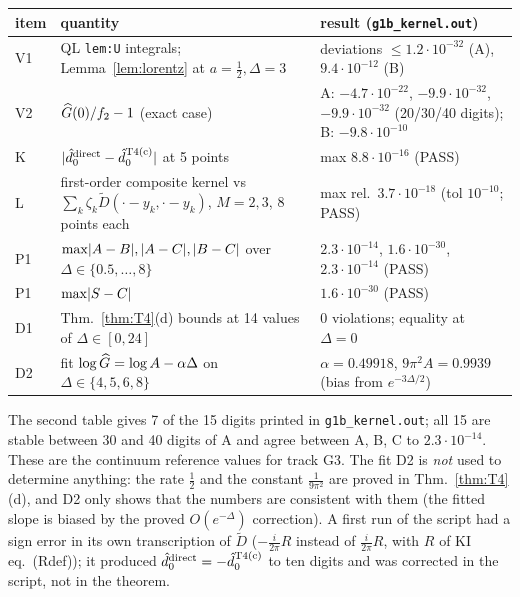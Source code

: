 \documentclass[11pt]{article}
\theoremstyle{definition}\newtheorem{hypothesis}[theorem]{Hypothesis}
\begin{document}
\begin{center}\small
\begin{tabular}{p{}p{}p{}}\toprule
item & quantity & result (\texttt{g1b\_kernel.out})\\\midrule
V1 & QL \texttt{lem:U} integrals; Lemma~\ref{lem:lorentz} at $a=\frac12,\Delta=3$ & deviations $\le1.2\cdot10^{-32}$ (A), $9.4\cdot10^{-12}$ (B)\\
V2 & $\widehat G(0)/f_2-1$ (exact case) & A: $-4.7\cdot10^{-22}$, $-9.9\cdot10^{-32}$, $-9.9\cdot10^{-32}$ (20/30/40 digits); B: $-9.8\cdot10^{-10}$\\
K & $\lvert\hat d_0^{\rm direct}-\hat d_0^{\rm T4(c)}\rvert$ at 5 points & max $8.8\cdot10^{-16}$ (PASS)\\
L & first-order composite kernel vs $\sum_k\zeta_k\widetilde D(\cdot-y_k,\cdot-y_k)$, $M=2,3$, 8 points each &
 max rel.\ $3.7\cdot10^{-18}$ (tol $10^{-10}$; PASS)\\
P1 & $\max\lvert A-B\rvert,\lvert A-C\rvert,\lvert B-C\rvert$ over $\Delta\in\{0.5,\dots,8\}$ & $2.3\cdot10^{-14}$, $1.6\cdot10^{-30}$, $2.3\cdot10^{-14}$ (PASS)\\
P1 & $\max\lvert S-C\rvert$ & $1.6\cdot10^{-30}$ (PASS)\\
D1 & Thm.~\ref{thm:T4}(d) bounds at 14 values of $\Delta\in[0,24]$ & 0 violations; equality at $\Delta=0$\\
D2 & fit $\log\widehat G=\log A-\alpha\Delta$ on $\Delta\in\{4,5,6,8\}$ & $\alpha=0.49918$, $9\pi^2A=0.9939$ (bias from $e^{-3\Delta/2}$)\\\bottomrule
\end{tabular}

\smallskip
{}
\end{center}
The second table gives 7 of the 15 digits printed in \texttt{g1b\_kernel.out}; all 15 are stable between 30 and
40 digits of A and agree between A, B, C to $2.3\cdot10^{-14}$.  These are the continuum reference values for
track G3.  The fit D2 is \emph{not} used to determine anything: the rate $\frac12$ and the constant
$\frac1{9\pi^2}$ are proved in Thm.~\ref{thm:T4}(d), and D2 only shows that the numbers are consistent with
them (the fitted slope is biased by the proved $O(e^{-\Delta})$ correction).  A first run of the script had a
sign error in its own transcription of $\widetilde D$ ($-\frac i{2\pi}R$ instead of $\frac i{2\pi}R$, with $R$ of
KI eq.~(Rdef)); it produced $\hat d_0^{\rm direct}=-\hat d_0^{\rm T4(c)}$ to ten digits and was corrected in the
script, not in the theorem.
\end{document}
